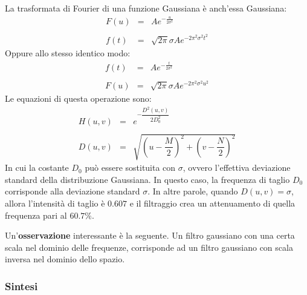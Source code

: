 \documentclass[a4paper]{article}
\begin{document}
	La trasformata di Fourier di una funzione Gaussiana è anch'essa Gaussiana:
	\begin{equation*}
		\begin{array}{lll}
			F\left(u\right) & = & Ae^{-\frac{u}{2\sigma^{2}}} \\
			&& \\
			f\left(t\right) & = & \sqrt{2 \pi} \sigma A e^{-2 \pi^{2} \sigma^{2} t^{2}}
		\end{array}
	\end{equation*}
	Oppure allo stesso identico modo:
	\begin{equation*}
		\begin{array}{lll}
			f\left(t\right) & = & Ae^{-\frac{t}{2\sigma^{2}}} \\
			&& \\
			F\left(u\right) & = & \sqrt{2 \pi} \sigma A e^{-2 \pi^{2} \sigma^{2} u^{2}}
		\end{array}
	\end{equation*}
	Le equazioni di questa operazione sono:
	\begin{equation*}
		\begin{array}{lll}
			H\left(u,v\right) & = & e^{-\dfrac{D^{2}\left(u,v\right)}{2 D_{0}^{2}}} \\
			&& \\
			D\left(u,v\right) & = & \sqrt{\left(u - \dfrac{M}{2}\right)^{2} + \left(v - \dfrac{N}{2}\right)^{2}}
		\end{array}
	\end{equation*}
	In cui la costante $D_{0}$ può essere sostituita con $\sigma$, ovvero l'effettiva deviazione standard della distribuzione Gaussiana. In questo caso, la frequenza di taglio $D_{0}$ corrisponde alla deviazione standard $\sigma$. In altre parole, quando $D\left(u,v\right) = \sigma$, allora l'intensità di taglio è $0.607$ e il filtraggio crea un attenuamento di quella frequenza pari al $60.7\%$.\newline
	
	\noindent
	Un'\textbf{osservazione} interessante è la seguente. Un filtro gaussiano con una certa scala nel dominio delle frequenze, corrisponde ad un filtro gaussiano con scala inversa nel dominio dello spazio.
	
	\subsubsection{Sintesi}
	
\end{document}
